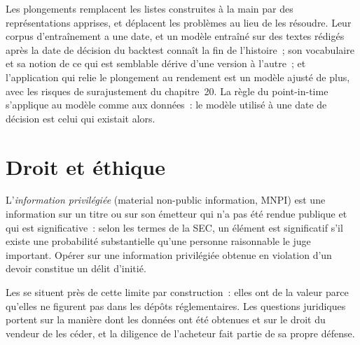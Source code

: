 Les plongements remplacent les listes construites à la main par des représentations apprises, et déplacent les problèmes au lieu de les résoudre. Leur corpus d'entraînement a
une date, et un modèle entraîné sur des textes rédigés après la date de décision du backtest connaît la fin de l'histoire~; son vocabulaire et sa notion de ce qui est semblable
dérive d'une version à l'autre~; et l'application qui relie le plongement au rendement est un modèle ajusté de plus, avec les risques de surajustement du
chapitre~20. La règle du point-in-time s'applique au modèle comme aux données~: le modèle utilisé à une date de décision est celui qui existait alors.

\section{Droit et éthique}

\begin{definition}\label{def:rs:alternative-and-text-data:mnpi}
L'\emph{information privilégiée} (material non-public information, MNPI) est une information sur un titre ou sur son émetteur qui n'a pas
été rendue publique et qui est significative~: selon les termes de la SEC, un élément est significatif s'il existe une probabilité substantielle qu'une personne raisonnable
le juge important. Opérer sur une information privilégiée obtenue en violation d'un devoir constitue un délit d'initié.
\end{definition}

Les  se situent près de cette limite par construction~: elles ont de la valeur parce qu'elles ne figurent pas dans les dépôts réglementaires. Les questions juridiques portent sur la manière dont les
données ont été obtenues et sur le droit du vendeur de les céder, et la diligence de l'acheteur fait partie de sa propre défense.

